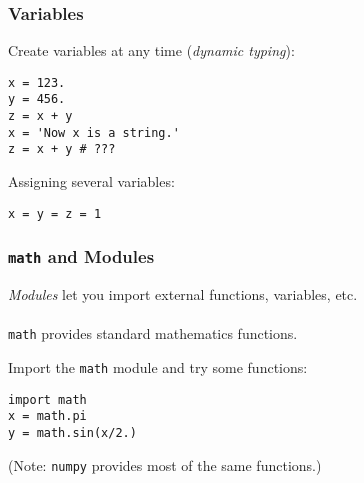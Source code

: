 \documentclass[red]{beamer}
\begin{document}
\begin{frame}[fragile]
    \frametitle{Variables}
    
    Create variables at any time (\textit{dynamic typing}):
    \begin{lstlisting}
x = 123.
y = 456.
z = x + y
x = 'Now x is a string.'
z = x + y # ???
    \end{lstlisting}

    Assigning several variables:
    \begin{lstlisting}
x = y = z = 1
    \end{lstlisting}

\end{frame}
\begin{frame}[fragile]
    \frametitle{\texttt{math} and Modules}
    
    \textit{Modules} let you import external functions, variables, etc.
    \\~\\
    \texttt{math} provides standard mathematics functions.

    Import the \texttt{math} module and try some functions:
    \begin{lstlisting}
import math
x = math.pi
y = math.sin(x/2.)
    \end{lstlisting}

    (Note: \texttt{numpy} provides most of the same functions.)
\end{frame}
\end{document}
